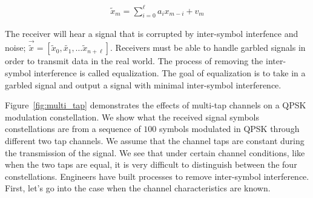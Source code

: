 \begin{align}
\tilde{x}_m = \sum_{i=0}^{\ell} a_i x_{m-i} + v_m
\end{align}

The receiver will hear a signal that is corrupted by inter-symbol interfence and noise;
$\vec{\tilde{x}}=[\tilde{x}_0, \tilde{x_1}, \ldots \tilde{x}_{n+\ell}]$. 
Receivers must be able to handle garbled signals in order to transmit data in the real world.  The process of removing the inter-symbol interference is called equalization.  The goal of equalization is to take in a garbled signal and output a signal with minimal inter-symbol interference. 

Figure~\ref{fig:multi_tap} demonstrates the effects of multi-tap channels on a QPSK modulation constellation.  
We show what the received signal symbols constellations are from a sequence of $100$ symbols modulated in QPSK through different two tap channels.  We assume that the channel taps are constant during the transmission of the signal.
We see that under certain channel conditions, like when the two taps are equal, it is very difficult to distinguish between the four constellations.  
Engineers have built processes to remove inter-symbol interference.  First, let's go into the case when the channel characteristics are known.

